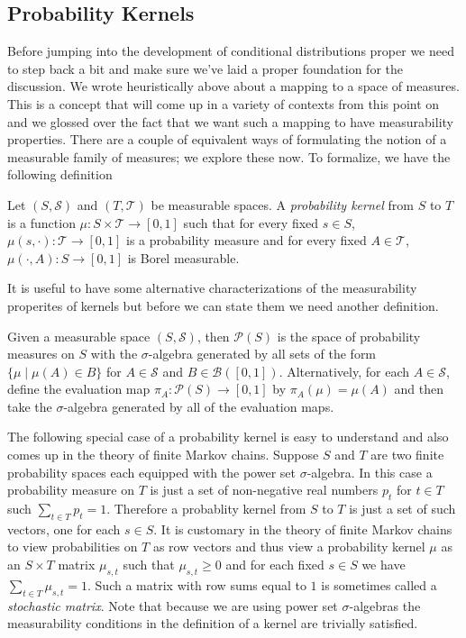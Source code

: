 \subsection{Probability Kernels}
Before jumping into the development of conditional distributions
proper we need to step back a bit and make sure we've laid a proper
foundation for the discussion.  We wrote heuristically above about a
mapping to a space of measures.  This is a concept that will come up in a variety of contexts from this point
on and we glossed over the fact that we want such a mapping to have
measurability properties.  There are a couple of equivalent ways of
formulating the notion of a measurable family of measures;  we
explore these now.
To formalize, we have the following definition
\begin{defn}
Let $(S, \mathcal{S})$ and $(T, \mathcal{T})$ be measurable spaces.  A
\emph{probability kernel} from $S$ to $T$ is a function $\mu : S
\times \mathcal{T} \to [0,1]$ 
such that for every fixed $s \in S$, $\mu(s, \cdot) : \mathcal{T} \to
[0,1]$ is a probability measure and for every fixed $A \in
\mathcal{T}$, $\mu(\cdot, A) : S \to [0,1]$ is Borel measurable.
\end{defn}

It is useful to have some alternative characterizations of the
measurability properites of kernels but before we can state them we
need another definition.
\begin{defn}Given a measurable space $(S, \mathcal{S})$, then
  $\mathcal{P}(S)$ is the space of probability measures on $S$ with
  the $\sigma$-algebra generated by all sets of the form $\lbrace \mu
  \mid \mu(A) \in B \rbrace$ for $A \in \mathcal{S}$ and $B \in
  \mathcal{B}([0,1])$.  Alternatively, for each $A \in \mathcal{S}$,
  define the evaluation map $\pi_A : \mathcal{P}(S) \to [0,1]$ by
  $\pi_A(\mu) = \mu(A)$ and then take the $\sigma$-algebra generated
  by all of the evaluation maps.
\end{defn}

\begin{examp}\label{ProbabilityKernelFiniteSampleSpace}
The following special case of a probability kernel is easy to
understand and also comes up in the theory of finite Markov chains.
Suppose $S$ and $T$ are two finite probability spaces each equipped with the power
set $\sigma$-algebra.  In this case a probability measure on $T$ is just
a set of non-negative real numbers $p_t$ for $t \in T$ such $\sum_{t
  \in T} p_t = 1$.  Therefore a probablity kernel from $S$ to $T$ is
just a set of such vectors, one for each $s \in S$.   It is customary in
the theory of finite Markov chains to view probabilities on $T$ as row
vectors and thus view a probability kernel $\mu$ as an $S \times T$ matrix
$\mu_{s,t}$ such that $\mu_{s,t} \geq 0$ and for each fixed $s \in S$
we have $\sum_{t \in T} \mu_{s,t} = 1$.  Such a matrix with row sums
equal to $1$ is sometimes called a \emph{stochastic matrix}.
Note that because we are using power set $\sigma$-algebras the
measurability conditions in the definition of a kernel are trivially
satisfied.
\end{examp}

